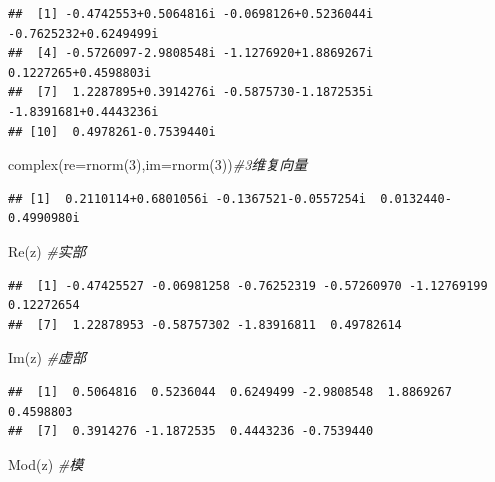 \documentclass[
]{book}
\newenvironment{Shaded}{\begin{snugshade}}{\end{snugshade}}
\newcommand{\AttributeTok}[1]{\textcolor[rgb]{0.77,0.63,0.00}{#1}}
\newcommand{\CommentTok}[1]{\textcolor[rgb]{0.56,0.35,0.01}{\textit{#1}}}
\newcommand{\DecValTok}[1]{\textcolor[rgb]{0.00,0.00,0.81}{#1}}
\newcommand{\FunctionTok}[1]{\textcolor[rgb]{0.00,0.00,0.00}{#1}}
\newcommand{\NormalTok}[1]{#1}
\begin{document}
\begin{verbatim}
##  [1] -0.4742553+0.5064816i -0.0698126+0.5236044i -0.7625232+0.6249499i
##  [4] -0.5726097-2.9808548i -1.1276920+1.8869267i  0.1227265+0.4598803i
##  [7]  1.2287895+0.3914276i -0.5875730-1.1872535i -1.8391681+0.4443236i
## [10]  0.4978261-0.7539440i
\end{verbatim}

\begin{Shaded}
\begin{Highlighting}[]
\FunctionTok{complex}\NormalTok{(}\AttributeTok{re=}\FunctionTok{rnorm}\NormalTok{(}\DecValTok{3}\NormalTok{),}\AttributeTok{im=}\FunctionTok{rnorm}\NormalTok{(}\DecValTok{3}\NormalTok{))}\CommentTok{\#3维复向量}
\end{Highlighting}
\end{Shaded}

\begin{verbatim}
## [1]  0.2110114+0.6801056i -0.1367521-0.0557254i  0.0132440-0.4990980i
\end{verbatim}

\begin{Shaded}
\begin{Highlighting}[]
\FunctionTok{Re}\NormalTok{(z) }\CommentTok{\#实部}
\end{Highlighting}
\end{Shaded}

\begin{verbatim}
##  [1] -0.47425527 -0.06981258 -0.76252319 -0.57260970 -1.12769199  0.12272654
##  [7]  1.22878953 -0.58757302 -1.83916811  0.49782614
\end{verbatim}

\begin{Shaded}
\begin{Highlighting}[]
\FunctionTok{Im}\NormalTok{(z) }\CommentTok{\#虚部}
\end{Highlighting}
\end{Shaded}

\begin{verbatim}
##  [1]  0.5064816  0.5236044  0.6249499 -2.9808548  1.8869267  0.4598803
##  [7]  0.3914276 -1.1872535  0.4443236 -0.7539440
\end{verbatim}

\begin{Shaded}
\begin{Highlighting}[]
\FunctionTok{Mod}\NormalTok{(z) }\CommentTok{\#模}
\end{Highlighting}
\end{Shaded}
\end{document}
